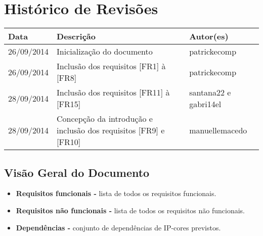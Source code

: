 \documentclass{article}
\begin{document}
\capa

\newpage

\section*{\center Histórico de Revisões}
  \vspace*{1cm}
  \begin{table}[ht]
    \centering
    \begin{tabular}[pos]{|m{2cm} | m{7.2cm} | m{3.8cm}|} 
      \hline
      \cellcolor[gray]{0.9}
      \textbf{Data} & \cellcolor[gray]{0.9}\textbf{Descrição} & \cellcolor[gray]{0.9}\textbf{Autor(es)}\\ \hline
      \hline
      \small 26/09/2014 & \small Inicialização do documento & \small patrickecomp \\ \hline      
      \small 26/09/2014 &
      \small Inclusão dos requisitos [FR1] à [FR8] & \small patrickecomp \\ \hline 
      \small 28/09/2014 & \small Inclusão dos requisitos [FR11] à [FR15] & \small santana22 e gabri14el \\ \hline
      \small 28/09/2014 & \small Concepção da introdução e inclusão dos requisitos [FR9] e [FR10] & \small manuellemacedo \\ \hline      
    \end{tabular}
  \end{table}

\newpage

\tableofcontents
\newpage

    

\subsection{Visão Geral do Documento}
  \begin{itemize}
   \item \textbf{Requisitos funcionais -} lista de todos os requisitos funcionais.
   \item \textbf{Requisitos não funcionais -} lista de todos os requisitos não funcionais.
   \item \textbf{Dependências -} conjunto de dependências de IP-cores previstos.
  \end{itemize}
\end{document}
